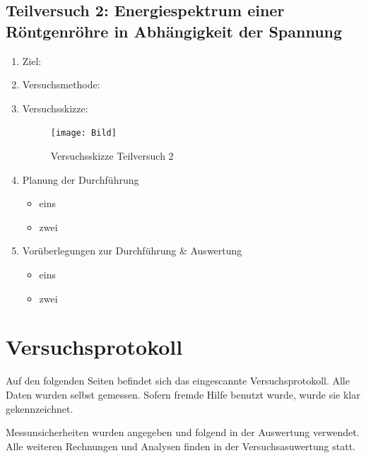 \documentclass{article}
\begin{document}
\subsection{Teilversuch 2: Energiespektrum einer Röntgenröhre in Abhängigkeit der Spannung}
\begin{enumerate}[label = (\Roman*)]
    \item Ziel: 
    
    \item Versuchsmethode: 
    
    \item Versuchsskizze:
    
        \begin{figure}[H]
        \centering
        \texttt{[image: Bild]}
        \caption{Versuchsskizze Teilversuch 2}
        \end{figure}

    \item Planung der Durchführung
        \begin{itemize}
           \item eins
           \item zwei
        \end{itemize}

    \item Vorüberlegungen zur Durchführung \& Auswertung
        \begin{itemize}
            \item eins
            \item zwei
        \end{itemize}
        
\end{enumerate}


\newpage

\section{Versuchsprotokoll}

Auf den folgenden Seiten befindet sich das eingescannte Versuchsprotokoll.
Alle Daten wurden selbst gemessen. Sofern fremde Hilfe benutzt wurde,
wurde sie klar gekennzeichnet.

Messunsicherheiten wurden angegeben und folgend in der Auswertung verwendet.
Alle weiteren Rechnungen und Analysen finden in der Versuchsasuwertung statt.


\end{document}
